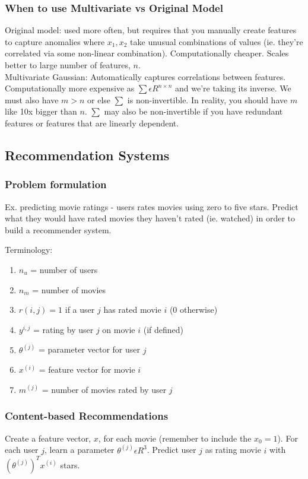 \documentclass[11pt,letterpaper]{article}
\begin{document}
\subsubsection{When to use Multivariate vs Original Model}
Original model: used more often, but requires that you manually create features to capture anomalies where $x_1, x_2$ take unusual combinations of values  (ie. they're correlated via some non-linear combination). Computationally cheaper. Scales better to large number of features, $n$. \\
Multivariate Gaussian: Automatically captures correlations between features. Computationally more expensive as $\sum \epsilon R^{n \times n}$ and we're taking its inverse. We must also have $ m > n $ or else $\sum$ is non-invertible. In reality, you should have $m$ like 10x bigger than $n$. $\sum$ may also be non-invertible if you have redundant features or features that are linearly dependent. 

\subsection{Recommendation Systems}
\subsubsection{Problem formulation}
Ex. predicting movie ratings - users rates movies using zero to five stars. Predict what they would have rated movies they haven't rated (ie. watched) in order to build a recommender system.

Terminology:
\begin{enumerate}
	\item $n_u$ = number of users
	\item $n_m$ = number of movies
	\item $r(i, j) = 1$ if a user $j$ has rated movie $i$ (0 otherwise)
	\item $y^{i,j}$ = rating by user $j$ on movie $i$ (if defined)
	\item $\theta^{(j)}$ = parameter vector for user $j$
	\item $x^{(i)}$ = feature vector for movie $i$
	\item $m^{(j)}$ = number of movies rated by user $j$
\end{enumerate}

\subsubsection{Content-based Recommendations}
Create a feature vector, $x$, for each movie (remember to include the $x_0 = 1$). For each user $j$, learn a parameter $\theta^{(j)} \epsilon R^3$. Predict user $j$ as rating movie $i$ with $(\theta^{(j)})^Tx^{(i)}$ stars.
\end{document}
